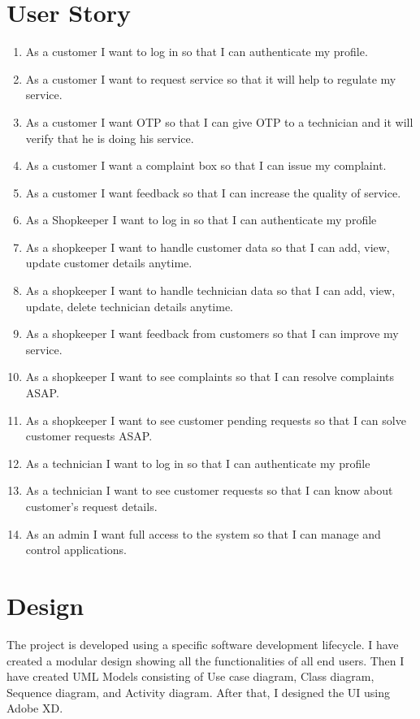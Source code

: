 \documentclass[conference]{IEEEtran}
\begin{document}
\section{User Story}
\begin{enumerate}
\item As a customer I want to log in so that I can authenticate
my profile.
\item As a customer I want to request service so that it will
help to regulate my service.
\item As a customer I want OTP so that I can give OTP to a
technician and it will verify that he is doing his service.
\item As a customer I want a complaint box so that I can issue
my complaint.
\item As a customer I want feedback so that I can increase the
quality of service.
\item As a Shopkeeper I want to log in so that I can
authenticate my profile
\item As a shopkeeper I want to handle customer data so that I
can add, view, update customer details anytime.
\item As a shopkeeper I want to handle technician data so that
I can add, view, update, delete technician details anytime.
\item As a shopkeeper I want feedback from customers so that
I can improve my service.
\item As a shopkeeper I want to see complaints so that I can
resolve complaints ASAP.
\item As a shopkeeper I want to see customer pending
requests so that I can solve customer requests ASAP.
\item As a technician I want to log in so that I can
authenticate my profile
\item As a technician I want to see customer requests so that
I can know about customer’s request details.
\item As an admin I want full access to the system so that I
can manage and control applications.
\end{enumerate}


\section{Design}
The project is developed using a specific software
development lifecycle. I have created a modular design
showing all the functionalities of all end users. Then I have
created UML Models consisting of Use case diagram, Class
diagram, Sequence diagram, and Activity diagram. After
that, I designed the UI using Adobe XD.
\end{document}
